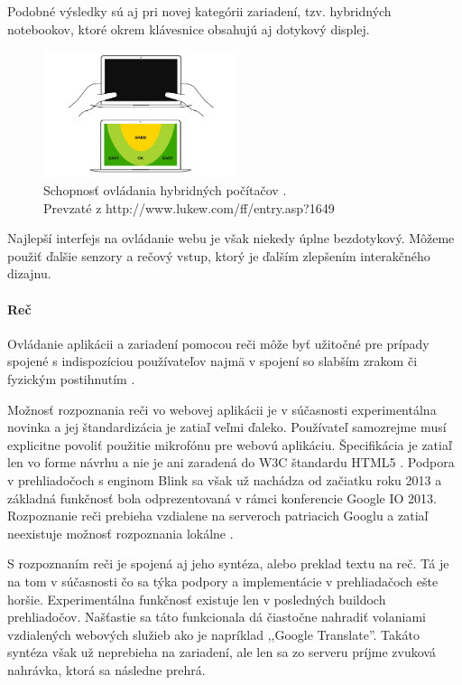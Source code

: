 Podobné výsledky \cite{mobilebooktouch} sú aj pri novej kategórii zariadení, tzv. hybridných notebookov, ktoré okrem klávesnice obsahujú aj dotykový displej.

\begin{figure}[H]
	\centering
	\includegraphics[width=0.5\textwidth]{img/tnav-touch-laptops.png}
	\caption[Schopnosť ovládania hybridných počítačov]{
		Schopnosť ovládania hybridných počítačov \cite{navigation}.\\
		Prevzaté z http://www.lukew.com/ff/entry.asp?1649}
	\label{fig: tnavlaptops}
\end{figure}

Najlepší interfejs na ovládanie webu je však niekedy úplne bezdotykový. Môžeme použiť ďalšie senzory a rečový vstup, ktorý je ďalším zlepšením interakčného dizajnu.

\paragraph{Reč} %

Ovládanie aplikácii a zariadení pomocou reči môže byť užitočné pre prípady spojené s indispozíciou používateľov najmä v spojení so slabším zrakom či fyzickým postihnutím \cite{SpeechRecognition}.

Možnosť rozpoznania reči vo webovej aplikácii je v súčasnosti experimentálna novinka a jej štandardizácia je zatiaľ veľmi ďaleko. Používateľ samozrejme musí explicitne povoliť použitie mikrofónu pre webovú aplikáciu. Špecifikácia je zatiaľ len vo forme návrhu a nie je ani zaradená do W3C štandardu HTML5 \cite{webspeechapi}. Podpora v prehliadočoch s enginom Blink sa však už nachádza od začiatku roku 2013 a základná funkčnosť bola odprezentovaná v rámci konferencie Google IO 2013. Rozpoznanie reči prebieha vzdialene na serveroch patriacich Googlu a zatiaľ neexistuje možnosť rozpoznania lokálne \cite{moreawesomeweb}.

S rozpoznaním reči je spojená aj jeho syntéza, alebo preklad textu na reč. Tá je na tom v súčasnosti čo sa týka podpory a implementácie v prehliadačoch ešte horšie. Experimentálna funkčnosť existuje len v posledných buildoch prehliadočov. Našťastie sa táto funkcionala dá čiastočne nahradiť volaniami vzdialených webových služieb ako je napríklad ,,Google Translate''. Takáto syntéza však už neprebieha na zariadení, ale len sa zo serveru príjme zvuková nahrávka, ktorá sa následne prehrá.

